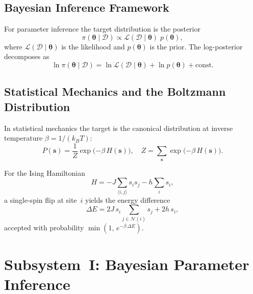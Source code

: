\documentclass[11pt,letterpaper,twocolumn]{article}
\theoremstyle{definition}
\begin{document}
\subsection{Bayesian Inference Framework}

For parameter inference the target distribution is the posterior
\begin{equation}\label{eq:posterior}
  \pi(\bm{\theta} \mid \mathcal{D})
    \propto \mathcal{L}(\mathcal{D} \mid \bm{\theta})\;p(\bm{\theta}),
\end{equation}
where $\mathcal{L}(\mathcal{D} \mid \bm{\theta})$ is the likelihood and $p(\bm{\theta})$ is the prior.  The log-posterior decomposes as
\begin{equation}\label{eq:log-posterior}
  \ln\pi(\bm{\theta} \mid \mathcal{D})
    = \ln\mathcal{L}(\mathcal{D} \mid \bm{\theta})
    + \ln p(\bm{\theta})
    + \mathrm{const.}
\end{equation}

\subsection{Statistical Mechanics and the Boltzmann Distribution}

In statistical mechanics the target is the canonical distribution at inverse temperature $\beta = 1/(k_B T)$:
\begin{equation}\label{eq:boltzmann}
  P(\mathbf{s}) = \frac{1}{Z}\exp\!\big({-\beta\,H(\mathbf{s})}\big),
  \quad
  Z = \sum_{\mathbf{s}} \exp\!\big({-\beta\,H(\mathbf{s})}\big).
\end{equation}

For the Ising Hamiltonian
\begin{equation}\label{eq:ising-H}
  H = -J\!\sum_{\langle i,j\rangle} s_i s_j
      - h\!\sum_i s_i,
\end{equation}
a single-spin flip at site~$i$ yields the energy difference
\begin{equation}\label{eq:delta-E}
  \Delta E = 2J\,s_i \sum_{j\in\mathcal{N}(i)} s_j + 2h\,s_i,
\end{equation}
accepted with probability $\min(1,\,e^{-\beta\,\Delta E})$.

\section{Subsystem~I: Bayesian Parameter Inference}\label{sec:bayesian}
\end{document}
